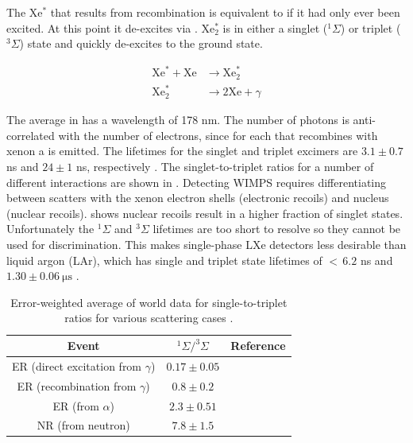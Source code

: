\vspace{-20pt}

The Xe$^{*}$ that results from recombination is equivalent to if it had only ever been excited.  At this point
it de-excites via .  Xe$_{2}^{*}$ is in either a singlet
($^{1}\Sigma$) or triplet ($^{3}\Sigma$) state and quickly de-excites to the ground state.

\vspace{-20pt}

\begin{subequations}
\begin{align}
\mathrm{Xe}^{*} + \mathrm{Xe} &\rightarrow \mathrm{Xe}_{2}^{*} \\
\mathrm{Xe}_{2}^{*} &\rightarrow 2\mathrm{Xe} + \gamma \label{eq:deexcite_gamma}
\end{align}
\label{eq:deexcite}
\end{subequations}

\vspace{-20pt}

The average \gammaray in  has a wavelength of 178 nm.  The number of photons is
anti-correlated with the number of electrons, since for each \electron that
recombines with xenon a \gammaray is emitted.  The lifetimes for the singlet and triplet
excimers are $3.1 \pm 0.7$ ns and $24 \pm 1$ ns, respectively .  The singlet-to-triplet ratios for
a number of different interactions are shown in .  Detecting WIMPS requires differentiating between
scatters with the xenon electron shells (electronic recoils) and nucleus (nuclear recoils).   shows
nuclear recoils result in a higher fraction of singlet states.  Unfortunately the $^1\Sigma$ and $^3\Sigma$ lifetimes
are too short to resolve so they cannot be used for discrimination.  This makes single-phase LXe detectors
less desirable than liquid argon (LAr), which has single and triplet state lifetimes of ${<}\, 6.2$ ns and $1.30 \pm 0.06\ \mathrm{\mu s}$
.

\begin{table}[t]
 \centering
 \begin{tabular}{ccc}
 \hline
 \hline
 Event & $^1\Sigma / ^3\Sigma$ & Reference \\
 \hline
 ER (direct excitation from $\gamma$) & $0.17 \pm 0.05$ & \\
 ER (recombination from $\gamma$) & $0.8 \pm 0.2$ & \\
 ER (from $\alpha$) & $2.3 \pm 0.51$ & \\
 NR (from neutron) & $7.8 \pm 1.5$ & \\
 \hline
 \hline
 \end{tabular}
 \caption{Error-weighted average of world data for single-to-triplet ratios for various scattering cases .}
\label{tab:singlet_to_triplet}
\end{table}

